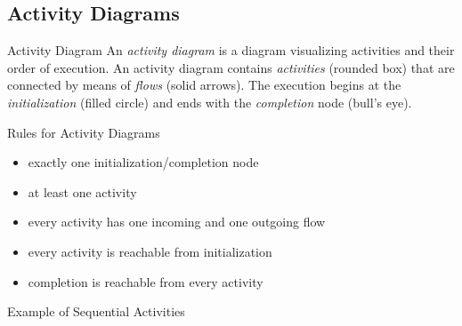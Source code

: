 
\subsection{Activity Diagrams}
\begin{frame}{\insertsubsection}
	\begin{fancycolumns}[animation=none]
		\nextcolumn
		\begin{definition}{Activity Diagram }
			An \emph{activity diagram} is a diagram visualizing activities and their order of execution. An activity diagram contains \emph{activities} (rounded box) that are connected by means of \emph{flows} (solid arrows). The execution begins at the \emph{initialization} (filled circle) and ends with the \emph{completion} node (bull's eye). 
		\end{definition}
		\pause%
		\begin{note}{Rules for Activity Diagrams}
			\begin{itemize}
				\item exactly one initialization/completion node
				\item at least one activity
				\item every activity has one incoming and one outgoing flow
				\item every activity is reachable from initialization
				\item completion is reachable from every activity
			\end{itemize}
		\end{note}
	\end{fancycolumns}
\end{frame}

\begin{frame}{Example of Sequential Activities}
\end{frame}

